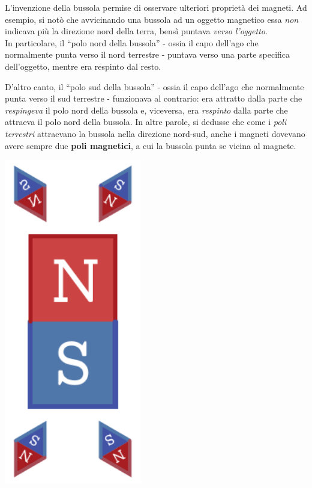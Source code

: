 L'invenzione della bussola permise di osservare ulteriori proprietà dei magneti. Ad esempio, si notò che avvicinando una bussola ad un oggetto magnetico essa \textit{non} indicava più la direzione nord della terra, bensì puntava \textit{verso l'oggetto}.\\
In particolare, il ``polo nord della bussola'' - ossia il capo dell'ago che normalmente punta verso il nord terrestre - puntava verso una parte specifica dell'oggetto, mentre era respinto dal resto.\\
\begin{minipage}{0.79\textwidth}
D'altro canto, il ``polo sud della bussola'' - ossia il capo dell'ago che normalmente punta verso il sud terrestre  - funzionava al contrario: era attratto dalla parte che \textit{respingeva} il polo nord della bussola e, viceversa, era \textit{respinto} dalla parte che attraeva il polo nord della bussola.
In altre parole, si dedusse che come i \textit{poli terrestri} attraevano la bussola nella direzione nord-sud, anche i magneti dovevano avere sempre due \textbf{poli magnetici}, a cui la bussola punta se vicina al magnete.
\end{minipage}\hspace{5pt}
\begin{minipage}{0.2\textwidth}
\begin{center}
	\includegraphics[width=0.45\textwidth]{images/chp7/chp7magnetebussola.pdf}
\end{center}
\end{minipage}
